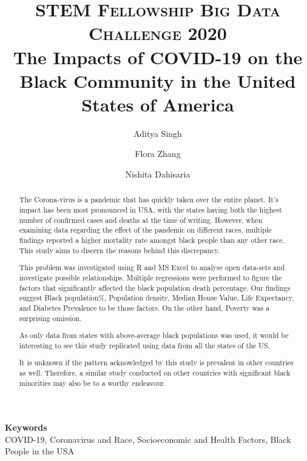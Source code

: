 \documentclass[10pt,twocolumn,letterpaper]{article}
\title{
		\usefont{OT1}{bch}{b}{n}
		\normalfont \normalsize \textsc{STEM Fellowship Big Data Challenge 2020} \\ [10pt]
		\huge{The Impacts of COVID-19 on the Black Community in the United States of America} \\
		
}
\author[1]{Aditya Singh}
\author[1]{Flora Zhang}
\author[1]{Nishita Dahisaria}
\affil[1]{University of British Columbia}
\begin{document}
\maketitle

\begin{abstract}
The Corona-virus is a pandemic that has quickly taken over the entire planet. It's impact has been most pronounced in USA, with the states having both the highest number of confirmed cases and deaths at the time of writing\cite{apm}. However, when examining data regarding the effect of the pandemic on different races, multiple findings reported a higher mortality rate amongst black people than any other race. This study aims to discern the reasons behind this discrepancy. 

This problem was investigated using R and MS Excel to analyse open data-sets and investigate possible relationships. Multiple regressions were performed to figure the factors that significantly affected the black population death percentage. Our findings suggest Black population\%, Population density, Median House Value, Life Expectancy, and Diabetes Prevalence to be those factors. On the other hand, Poverty was a surprising omission. 

As only data from states with above-average black populations was used, it would be interesting to see this study replicated using data from all the states of the US. 

It is unknown if the pattern acknowledged by this study is prevalent in other countries as well. Therefore, a similar study conducted on other countries with significant black minorities may also be to a worthy endeavour. 


\end{abstract} 
{\textbf{Keywords} \\
COVID-19, Coronavirus and Race, Socioeconomic and Health Factors, Black People in the USA}
\end{document}
